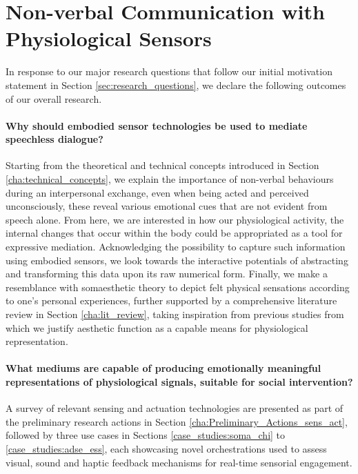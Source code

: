 \section{Non-verbal Communication with Physiological Sensors}

In response to our major research questions that follow our initial motivation statement in Section \ref{sec:research_questions}, we declare the following outcomes of our overall research.


\paragraph{Why should embodied sensor technologies be used to mediate speechless dialogue?}

Starting from the theoretical and technical concepts introduced in Section \ref{cha:technical_concepts}, we explain the importance of non-verbal behaviours during an interpersonal exchange, even when being acted and perceived unconsciously, these reveal various emotional cues that are not evident from speech alone. From here, we are interested in how our physiological activity, the internal changes that occur within the body could be appropriated as a tool for expressive mediation. Acknowledging the possibility to capture such information using embodied sensors, we look towards the interactive potentials of abstracting and transforming this data upon its raw numerical form. Finally, we make a resemblance with somaesthetic theory to depict felt physical sensations according to one's personal experiences, further supported by a comprehensive literature review in Section \ref{cha:lit_review}, taking inspiration from previous studies from which we justify aesthetic function as a capable means for physiological representation.

\paragraph{What mediums are capable of producing emotionally meaningful representations of physiological signals, suitable for social intervention?}

A survey of relevant sensing and actuation technologies are presented as part of the preliminary research actions in Section \ref{cha:Preliminary_Actions_sens_act}, followed by three use cases in Sections \ref{case_studies:soma_chi} to \ref{case_studies:adse_ess}, each showcasing novel orchestrations used to assess visual, sound and haptic feedback mechanisms for real-time sensorial engagement. 

